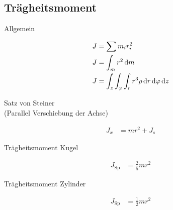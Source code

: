 \subsection{Trägheitsmoment}


\begin{boxleft}Allgemein
\end{boxleft}\begin{boxrightshaded}
\begin{align}
J&=\sum m_i r_i^2\\
J&=\int_m r^2 \mathop{}\!\mathrm{d} m \\
J&=\int_z\int_\varphi\int_r r^3\rho \mathop{}\!\mathrm{d} r \mathop{}\!\mathrm{d} \varphi \mathop{}\!\mathrm{d} z 
\end{align}
\end{boxrightshaded}

\begin{boxleft}Satz von Steiner\\(Parallel Verschiebung der Achse)
\end{boxleft}\begin{boxrightshaded}
\begin{align}
J_x&=mr^2+J_s
\end{align}
\end{boxrightshaded}

\begin{boxleft}Trägheitsmoment Kugel\\
\end{boxleft}\begin{boxrightshaded}
\begin{align}
J_\text{Sp}&=\frac{2}{5}mr^2
\end{align}
\end{boxrightshaded}

\begin{boxleft}Trägheitsmoment Zylinder\\
\end{boxleft}\begin{boxrightshaded}
\begin{align}
J_\text{Sp}&=\frac{1}{2}mr^2
\end{align}
\end{boxrightshaded}

